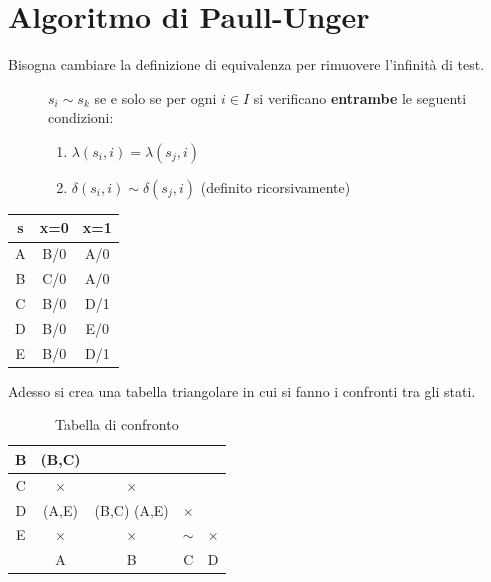 \documentclass[a4paper]{article}
\theoremstyle{break}
\theoremstyle{break}
\theoremstyle{break}
\theoremstyle{break}
\begin{document}
\section{Algoritmo di Paull-Unger}
Bisogna cambiare la definizione di equivalenza per rimuovere l'infinità di test.
\begin{figure}[H]
  \begin{definition}
    \( s_i \sim s_k \) se e solo se per ogni \( i \in I \) si verificano \textbf{entrambe}
    le seguenti condizioni:
    \begin{enumerate}
      \item \( \lambda(s_i,i) = \lambda(s_j,i) \)
      \item \( \delta(s_i,i) \sim \delta(s_j,i) \) (definito ricorsivamente)
    \end{enumerate}
  \end{definition}
\end{figure}
\begin{table}[H]
  \begin{center}
    \begin{tabular}{c|c|c}
      s & x=0 & x=1 \\
      \hline
      A & B/0 & A/0 \\
      B & C/0 & A/0 \\
      C & B/0 & D/1 \\
      D & B/0 & E/0 \\
      E & B/0 & D/1 \\
    \end{tabular}
  \end{center}
\end{table}
Adesso si crea una tabella triangolare in cui si fanno i confronti tra gli stati.
\begin{table}[H]
  \begin{center}
    \begin{tabular}{c|c|c|c|c}
      B & (B,C) &  &  &  \\
      \hline
      C & \( \times  \)  & \( \times \)  &  &  \\
      \hline
      D & (A,E) & (B,C) (A,E) & \( \times  \)  &  \\
      \hline
      E & \( \times  \)  & \( \times  \)  & \( \sim \)  & \( \times  \)  \\
      \hline
        & A & B & C & D \\
    \end{tabular}
  \end{center}
  \caption{Tabella di confronto}
\end{table}
\end{document}
